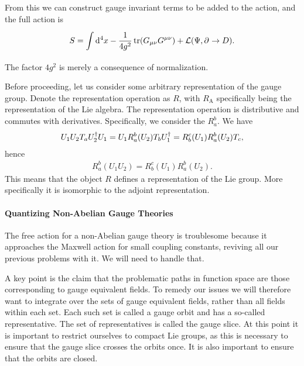 From this we can construct gauge invariant terms to be added to the action, and the full action is
\begin{align*}
	S = \int\limits_{}^{}\dd[4]{x}-\frac{1}{4g^{2}}\tr(G_{\mu\nu}G^{\mu\nu}) + \mathcal{L}(\Psi, \partial^{}_{}\to D).
\end{align*}
The factor $4g^{2}$ is merely a consequence of normalization.

Before proceeding, let us consider some arbitrary representation of the gauge group. Denote the representation operation as $R$, with $R_{\text{A}}$ specifically being the representation of the Lie algebra. The representation operation is distributive and commutes with derivatives. Specifically, we consider the $R_{a}^{b}$. We have
\begin{align*}
	U_{1}U_{2}T_{a}U_{2}^{\dagger} U_{1} = U_{1}R_{a}^{b}(U_{2})T_{b}U_{1}^{\dagger} = R_{b}^{c}(U_{1})R_{a}^{b}(U_{2})T_{c},
\end{align*}
hence
\begin{align*}
	R_{a}^{b}(U_{1}U_{2}) = R_{b}^{c}(U_{1})R_{a}^{b}(U_{2}).
\end{align*}
This means that the object $R$ defines a representation of the Lie group. More specifically it is isomorphic to the adjoint representation.

\paragraph{Quantizing Non-Abelian Gauge Theories}
The free action for a non-Abelian gauge theory is troublesome because it approaches the Maxwell action for small coupling constants, reviving all our previous problems with it. We will need to handle that.

A key point is the claim that the problematic paths in function space are those corresponding to gauge equivalent fields. To remedy our issues we will therefore want to integrate over the sets of gauge equivalent fields, rather than all fields within each set. Each such set is called a gauge orbit and has a so-called representative. The set of representatives is called the gauge slice. At this point it is important to restrict ourselves to compact Lie groups, as this is necessary to ensure that the gauge slice crosses the orbits once. It is also important to ensure that the orbits are closed.

